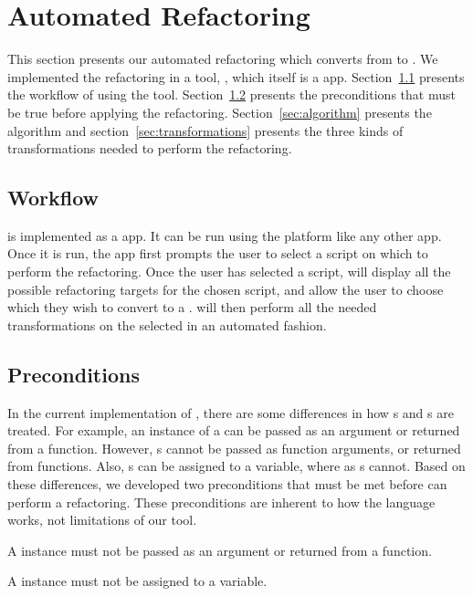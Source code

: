 \documentclass{sigplanconf}
\begin{document}
\section{Automated Refactoring}
\label{sec:Refactoring}
This section presents our automated refactoring which converts from \NC{} to . We implemented the 
refactoring in a tool, \tool, which itself is a \TD app.
Section~\ref{sec:workflow} presents the workflow of using the tool. Section~\ref{sec:preconditions} presents the preconditions that must be true
before applying the refactoring. Section~\ref{sec:algorithm} presents the algorithm and section~\ref{sec:transformations} presents the three kinds of transformations needed to perform the refactoring.


\subsection{Workflow}
\label{sec:workflow}
\tool is implemented as a \TD app.  It can be run using the \TD platform like any other \TD app.  Once it is run, the app first prompts the user to select a script on which to perform the refactoring.  Once the user has selected a script, \tool will display all the possible refactoring targets for the chosen script, and allow the user to choose which \NC they wish to convert to a \CDT. \tool will then perform all the needed transformations on the selected \NC in an automated fashion.  


\subsection{Preconditions}
\label{sec:preconditions}
In the current implementation of \TD, there are some differences in how \NC{}s and \CDT{}s are treated.
For example, an instance of a \NC{} can be passed as an argument or returned from a \TD function.  However, \CDT{}s cannot be passed as function arguments, or returned from functions.  Also, \NC{}s can be assigned to a variable, where as \CDT{}s cannot.  Based on these differences, we developed two preconditions that must be met before \tool can perform a refactoring.  These preconditions are inherent to how the \TD language works, not limitations of our tool.   

\POne  A \NC{} instance must not be passed as an argument or returned from a function. 

\PTwo A \NC{} instance must not be assigned to a variable.
\end{document}
